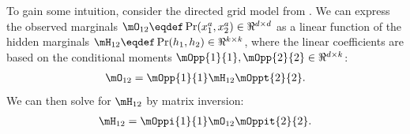 



To gain some intuition, consider the directed grid model from .
We can express the observed marginals $\mO_{12} \eqdef \Pr(x^a_1, x^a_2) \in \Re^{d \times d}$
as a linear function of the hidden marginals $\mH_{12} \eqdef \Pr(h_1, h_2) \in \Re^{k \times k}$,
where the linear coefficients are based on the conditional moments
$\mOpp{1}{1},\mOpp{2}{2} \in \Re^{d \times k}$:
\begin{align*}
\mO_{12} = \mOpp{1}{1} \mH_{12} \mOppt{2}{2}.
\end{align*}
We can then solve for $\mH_{12}$ by matrix inversion:
\begin{align*}
\mH_{12} = \mOppi{1}{1} \mO_{12} \mOppit{2}{2}.
\end{align*}


